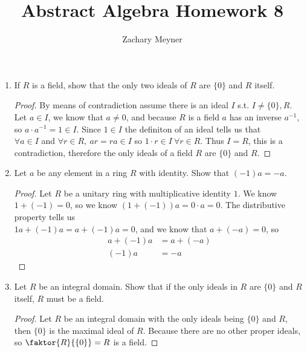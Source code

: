 \documentclass[12pt]{article}
\title{\large Abstract Algebra Homework 8}
\author{\large Zachary Meyner}
\date{}
\newcommand\setitemnumber[1]{\setcounter{enumi}{\numexpr#1--1\relax}}
\begin{document}
\maketitle
\begin{enumerate}[label=\textbf{\arabic*}.]
    \setitemnumber{14}
    \item If $R$ is a field, show that the only two ideals of $R$ are $\{0\}$ and $R$ itself.
    \begin{proof}
        By means of contradiction assume there is an ideal $I$ s.t. $I \neq \{0\}, R$. \\
        Let $a \in I$, we know that $a \neq 0$, and because $R$ is a field $a$ has an inverse $a^{-1}$, so 
        $a \cdot a^{-1} = 1 \in I$. Since $1 \in I$ the definiton of an ideal tells us that \\
        $\forall a \in I$ and $\forall r \in R, \ ar = ra \in I$ so $1 \cdot r \in I \ \forall r \in R$. Thus $I = R$, this is a 
        contradiction, therefore the only ideals of a field $R$ are $\{0\}$ and $R$.
    \end{proof}
    
    \setitemnumber{15}
    \item Let $a$ be any element in a ring $R$ with identity. Show that $(-1)a = -a$.
    \begin{proof}
        Let $R$ be a unitary ring with multiplicative identity $1$. We know $1 + (-1) = 0 $, 
        so we know $(1 + (-1))a = 0 \cdot a = 0$. The distributive property tells us \\
        $1a + (-1)a = a + (-1)a = 0$, and we know that $a + (-a) = 0$, so 
        \begin{align*}
            a + (-1)a &= a + (-a) \\
            (-1)a &= -a
        \end{align*}
    \end{proof}

    \setitemnumber{24}
    \item Let $R$ be an integral domain. Show that if the only ideals in $R$ are $\{0\}$ and $R$ itself, $R$ 
    must be a field.
    \begin{proof}
        Let $R$ be an integral domain with the only ideals being $\{0\}$ and $R$, then $\{0\}$ is 
        the maximal ideal of $R$. Because there are no other proper ideals, so $\faktor{R}{\{0\}} = R$ is a 
        field. 
    \end{proof}


\end{enumerate}
\end{document}

